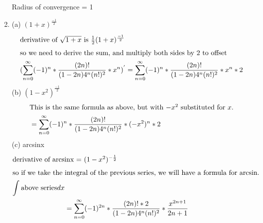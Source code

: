 \documentclass[12pt]{article}
\begin{document}
\begin{enumerate}
{\begin{minipage}{15em}
                Radius of convergence = 1
                \end{minipage}}
        \item 
                \subitem (a) $(1+x)^{\frac{-1}{2}}$ 
                \begin{align*}
                        \shortintertext{derivative of $\sqrt{1+x} $ is $\frac{1}{2}(1+x)^{ \frac{-1}{2}}$} 
                        \shortintertext{so we need to derive the sum, and multiply both sides by 2 to offset} 
                        (\sum_{n=0}^{\infty} (-1)^{n} * \frac{(2n)!}{(1-2n)4^{n}(n!)^{2}}*x^{n}) ^{'} = \sum_{n=0}^{\infty} (-1)^{n} * \frac{(2n)!}{(1-2n)4^{n}(n!)^{2}}* x^{n} * 2  
                \end{align*}
                \subitem (b) $(1-x^{2})^{\frac{-1}{2}}$ 
                \begin{align*}
                        \shortintertext{This is the same formula as above, but with $-x^{2}$ substituted for $x$.} 
                        &= \sum_{n=0}^{\infty} (-1)^{n} * \frac{(2n)!}{(1-2n)4^{n}(n!)^{2}}  * (-x^{2})^{n} * 2
                \end{align*}
                \subitem (c) arcsinx
                \begin{align*}
                        \shortintertext{derivative of arcsinx = $(1-x^{2})^{-\frac{1}{2}}$} 
                        \shortintertext{so if we take the integral of the previous series, we will have a formula for arcsin.} 
                        \int_{}^{} \text{above series} dx\\
                        &= \sum_{n=0}^{\infty} (-1)^{2n} * \frac{(2n)! * 2}{(1-2n)4^{n}(n!)^{2}} * \frac{x^{2n+1}}{2n+1}
                \end{align*}
                

\end{enumerate}
\end{document}
